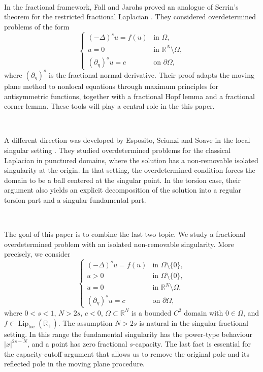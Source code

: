 \documentclass[11pt,a4paper]{article}
\newcommand{\R}{\mathbb R}
\newcommand{\Lip}{\operatorname{Lip}}
\newcommand{\loc}{\mathrm{loc}}
\begin{document}
\

In the fractional framework, Fall and Jarohs proved an analogue of Serrin's theorem for the restricted fractional Laplacian \cite{FallJarohs}. They considered overdetermined problems of the form
\[
\begin{cases}
(-\Delta)^s u=f(u) & \text{in }\Omega,\\
u=0 & \text{in }\R^N\setminus\Omega,\\
(\partial_\eta)^s u=c & \text{on }\partial\Omega,
\end{cases}
\]
where \((\partial_\eta)^s\) is the fractional normal derivative. Their proof adapts the moving plane method to nonlocal equations through maximum principles for antisymmetric functions, together with a fractional Hopf lemma and a fractional corner lemma. These tools will play a central role in the this paper.

\

A different direction was developed by Esposito, Sciunzi and Soave in the local singular setting \cite{ESS}. They studied overdetermined problems for the classical Laplacian in punctured domains, where the solution has a non-removable isolated singularity at the origin. In that setting, the overdetermined condition forces the domain to be a ball centered at the singular point. In the torsion case, their argument also yields an explicit decomposition of the solution into a regular torsion part and a singular fundamental part.

\

The goal of this paper is to combine the last two topic. We study a fractional overdetermined problem with an isolated non-removable singularity. More precisely, we consider
\begin{equation}\label{eq:main problem}
\begin{cases}
(-\Delta)^s u=f(u) & \text{in }\Omega\setminus\{0\},\\
u>0 & \text{in }\Omega\setminus\{0\},\\
u=0 & \text{in }\R^N\setminus\Omega,\\
(\partial_\eta)^s u=c & \text{on }\partial\Omega,
\end{cases}
\end{equation}
where \(0<s<1\), \(N>2s\), \(c<0\), \(\Omega\subset\R^N\) is a bounded \(C^2\) domain with \(0\in\Omega\), and \(f\in\Lip_{\loc}(\R_+)\). The assumption \(N>2s\) is natural in the singular fractional setting. In this range the fundamental singularity has the power-type behaviour \(|x|^{2s-N}\), and a point has zero fractional \(s\)-capacity. The last fact is essential for the capacity-cutoff argument that allows us to remove the original pole and its reflected pole in the moving plane procedure.
\end{document}
